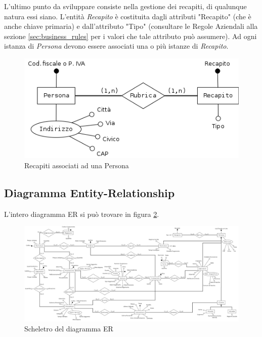 			L'ultimo punto da sviluppare consiste nella gestione dei recapiti, di qualunque natura essi siano. L'entità \emph{Recapito} è costituita dagli attributi "Recapito" (che è anche chiave primaria) e dall'attributo "Tipo" (consultare le Regole Aziendali alla sezione \ref{sec:business_rules} per i valori che tale attributo può assumere).
			Ad ogni istanza di \emph{Persona} devono essere associati una o più istanze di \emph{Recapito}.
			
			\begin{figure}[H]
				\centering
				\includegraphics[width=11.5cm]{images/finitures/persona_rubrica.png}
				\caption{Recapiti associati ad una Persona}
				\label{fig:persona_recapito}
			\end{figure}
	
	\subsection{Diagramma Entity-Relationship}
		
		L'intero diagramma ER si può trovare in figura \ref{fig:er}.
			
		\begin{figure}
			\centering
			\includegraphics[width=22cm]{images/finitures/schema.png}
			\caption{Scheletro del diagramma ER}
			\label{fig:er}
		\end{figure}


